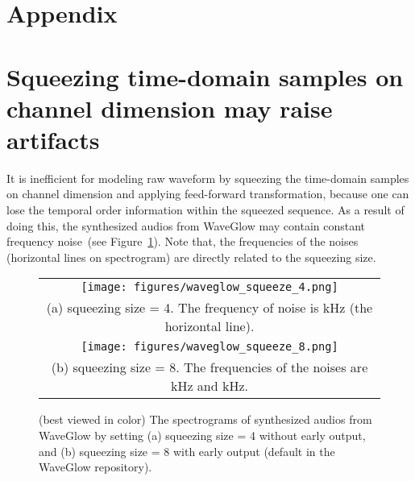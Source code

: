 \documentclass{article}
\begin{document}
\nocite{wang2019neural}







\onecolumn


\appendix

\section*{{\Large Appendix}}

\section{Squeezing time-domain samples on channel dimension may raise artifacts}
\label{appendix:waveglow_noise}
It is inefficient for modeling raw waveform by squeezing the time-domain samples on channel dimension and applying feed-forward transformation, because one can lose the temporal order information within the squeezed sequence.
As a result of doing this, the synthesized audios from WaveGlow may contain constant frequency noise~(see Figure~\ref{fig:waveglow_noise}).
Note that, the frequencies of the noises (horizontal lines on spectrogram) are directly related to the squeezing size.  


\begin{figure}[h] \centering
\begin{tabular}{c}
\hspace{-.3cm}
\texttt{[image: figures/waveglow\_squeeze\_4.png]} 
\\
{\small (a) squeezing size = 4. The frequency of noise is  kHz (the horizontal line).}
\vspace{0.2cm}
\\
\hspace{-.3cm}
\texttt{[image: figures/waveglow\_squeeze\_8.png]} 
\\
{\small (b) squeezing size = 8. The frequencies of the noises are  kHz and  kHz.}
\vspace{-.5em}
\\
\end{tabular}
\vspace{0.2em}
\caption{(best viewed in color) The spectrograms of synthesized audios from WaveGlow by setting (a) squeezing size = 4 without early output, and (b) squeezing size = 8 with early output (default in the WaveGlow repository).}
\label{fig:waveglow_noise} \end{figure}
\end{document}
